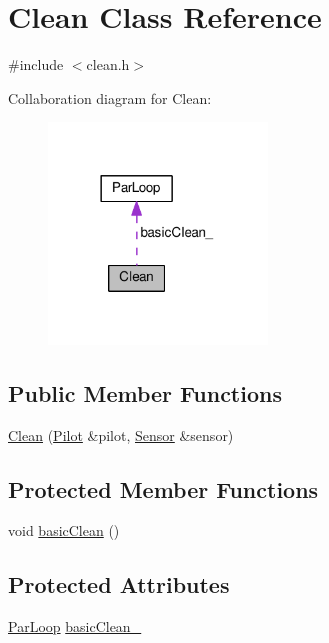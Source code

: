 \hypertarget{class_clean}{}\section{Clean Class Reference}
\label{class_clean}


{\ttfamily \#include $<$clean.\+h$>$}



Collaboration diagram for Clean\+:\nopagebreak
\begin{figure}[H]
\begin{center}
\leavevmode
\includegraphics[width=165pt]{class_clean__coll__graph}
\end{center}
\end{figure}
\subsection*{Public Member Functions}
\begin{DoxyCompactItemize}
\item 
\hyperlink{class_clean_aae88101ce31af78d9af25405d281bf8a}{Clean} (\hyperlink{class_pilot}{Pilot} \&pilot, \hyperlink{class_sensor}{Sensor} \&sensor)
\end{DoxyCompactItemize}
\subsection*{Protected Member Functions}
\begin{DoxyCompactItemize}
\item 
void \hyperlink{class_clean_a903925ff3d36c13e2bf4d004645055bd}{basic\+Clean} ()
\end{DoxyCompactItemize}
\subsection*{Protected Attributes}
\begin{DoxyCompactItemize}
\item 
\hyperlink{class_par_loop}{Par\+Loop} \hyperlink{class_clean_ace2cc08f6555b450d4941d9f05cc337b}{basic\+Clean\+\_\+}
\end{DoxyCompactItemize}


